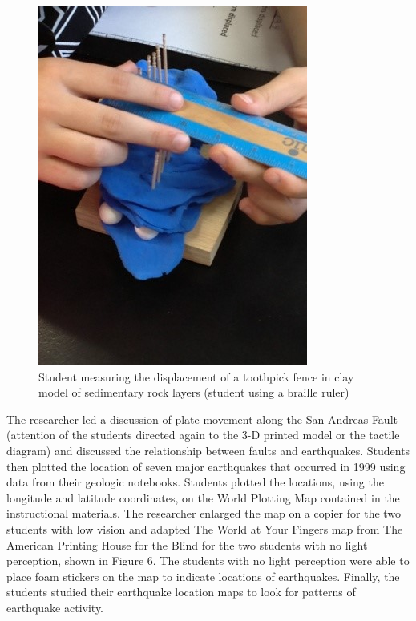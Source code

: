 \documentclass[11.5pt]{sig-alternate} %
\begin{document}
\begin{large}
\begin{figure}[h]
    \centering
    \includegraphics{images/fig5.jpg}
    \caption{Student measuring the displacement of a toothpick fence in clay model of sedimentary rock layers (student using a braille ruler)}
\end{figure}

The researcher led a discussion of plate movement along the San Andreas Fault (attention of the students directed again to the 3-D printed model or the tactile diagram) and discussed the relationship between faults and earthquakes. Students then plotted the location of seven major earthquakes that occurred in 1999 using data from their geologic notebooks.  Students plotted the locations, using the longitude and latitude coordinates, on the World Plotting Map contained in the instructional materials. The researcher enlarged the map on a copier for the two students with low vision and adapted The World at Your Fingers map from The American Printing House for the Blind for the two students with no light perception, shown in Figure 6.  The students with no light perception were able to place foam stickers on the map to indicate locations of earthquakes.  Finally, the students studied their earthquake location maps to look for patterns of earthquake activity.
 

\end{large}
\end{document}
